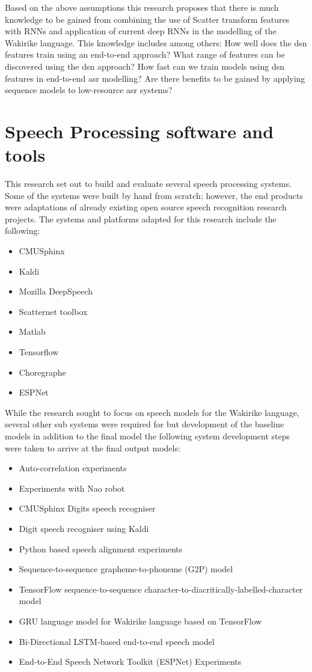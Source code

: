 Based on the above assumptions this research proposes that there is much knowledge to be gained from combining the use of Scatter transform features with RNNs and application of current deep RNNs in the modelling of the Wakirike language.  This knowledge includes among others:
How well does the \acrshort{dsn} features train using an end-to-end approach?
What range of features can be discovered using the \acrshort{dsn} approach?
How fast can we train models using \acrshort{dsn} features in end-to-end \acrshort{asr} modelling?
Are there benefits to be gained by applying sequence models to low-resource \acrshort{asr} systems?


\section{Speech Processing software and tools}
This research set out to build and evaluate several speech processing systems.  Some of the systems were built by hand from scratch; however, the end products were adaptations of already existing open source speech recognition research projects.  The systems and platforms adapted for this research include the following:
\begin{itemize}
    \item CMUSphinx
    \item Kaldi
    \item Mozilla DeepSpeech
    \item Scatternet toolbox
    \item Matlab
    \item Tensorflow
    \item Choregraphe
    \item ESPNet
\end{itemize}

While the research sought to focus on speech models for the Wakirike language, several other sub systems were required for but development of the baseline models in addition to the final model the following system development steps were taken to arrive at the final output models:
\begin{itemize}
    \item Auto-correlation experiments
    \item Experiments with Nao robot
    \item CMUSphinx Digits speech recogniser
    \item Digit speech recogniser using Kaldi
    \item Python based speech alignment experiments
    \item Sequence-to-sequence grapheme-to-phoneme (G2P) model
    \item TensorFlow sequence-to-sequence character-to-diacritically-labelled-character model
    \item GRU language model for Wakirike language based on TensorFlow
    \item Bi-Directional LSTM-based end-to-end speech model
    \item End-to-End Speech Network Toolkit (ESPNet) Experiments

\end{itemize}

